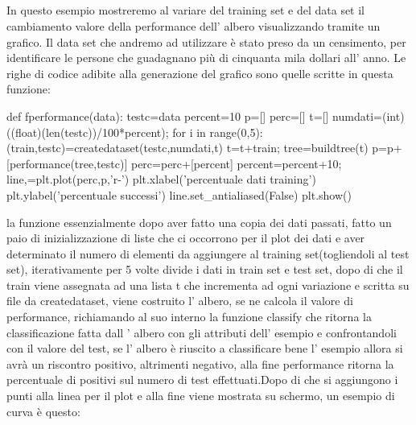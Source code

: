 		\subsection{}
		In questo esempio mostreremo al variare del training set e del data set il cambiamento valore della performance dell' albero visualizzando tramite un grafico.
		Il data set che andremo ad utilizzare è stato preso da un censimento, per identificare le persone che guadagnano più di cinquanta mila dollari all' anno.
		Le righe di codice adibite alla generazione del grafico sono quelle scritte in questa funzione:
		\begin{python}
		def fperformance(data):
			testc=data
			percent=10
			p=[]
			perc=[]
			t=[]
			numdati=(int)((float)(len(testc))/100*percent);
			for i in range(0,5):
				(train,testc)=createdataset(testc,numdati,t)
				t=t+train;
				tree=buildtree(t)
				p=p+[performance(tree,testc)]
				perc=perc+[percent]
				percent=percent+10;
				line,=plt.plot(perc,p,'r-')
			plt.xlabel('percentuale dati training')
			plt.ylabel('percentuale successi')
			line.set_antialiased(False)
			plt.show()
		\end{python}
		la funzione essenzialmente dopo aver fatto una copia dei dati passati, fatto un paio di inizializzazione di liste che ci occorrono per il plot dei dati e aver determinato il numero di elementi da aggiungere al training set(togliendoli al test set), iterativamente per 5 volte divide i dati in train set e test set, dopo di che il train viene assegnata ad una lista t che incrementa ad ogni variazione e scritta su file da createdataset, viene costruito l' albero, se ne calcola il valore di performance, richiamando al suo interno la funzione classify che ritorna la classificazione  fatta dall ' albero con gli attributi dell' esempio e confrontandoli con il valore del test, se l' albero è riuscito a classificare bene l' esempio allora si avrà un riscontro positivo, altrimenti negativo, alla fine performance ritorna la percentuale di positivi sul numero di test effettuati.Dopo di che si aggiungono i punti alla linea per il plot e alla fine viene mostrata su schermo, un esempio di curva è questo:
